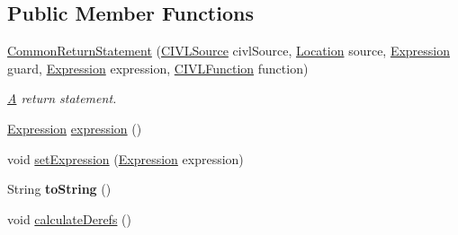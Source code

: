 \subsection*{Public Member Functions}
\begin{DoxyCompactItemize}
\item 
\hyperlink{classedu_1_1udel_1_1cis_1_1vsl_1_1civl_1_1model_1_1common_1_1statement_1_1CommonReturnStatement_a0a579c5c5d409ed8215f6fa87ad483bf}{Common\+Return\+Statement} (\hyperlink{interfaceedu_1_1udel_1_1cis_1_1vsl_1_1civl_1_1model_1_1IF_1_1CIVLSource}{C\+I\+V\+L\+Source} civl\+Source, \hyperlink{interfaceedu_1_1udel_1_1cis_1_1vsl_1_1civl_1_1model_1_1IF_1_1location_1_1Location}{Location} source, \hyperlink{interfaceedu_1_1udel_1_1cis_1_1vsl_1_1civl_1_1model_1_1IF_1_1expression_1_1Expression}{Expression} guard, \hyperlink{interfaceedu_1_1udel_1_1cis_1_1vsl_1_1civl_1_1model_1_1IF_1_1expression_1_1Expression}{Expression} expression, \hyperlink{interfaceedu_1_1udel_1_1cis_1_1vsl_1_1civl_1_1model_1_1IF_1_1CIVLFunction}{C\+I\+V\+L\+Function} function)
\begin{DoxyCompactList}\small\item\em \hyperlink{structA}{A} return statement. \end{DoxyCompactList}\item 
\hyperlink{interfaceedu_1_1udel_1_1cis_1_1vsl_1_1civl_1_1model_1_1IF_1_1expression_1_1Expression}{Expression} \hyperlink{classedu_1_1udel_1_1cis_1_1vsl_1_1civl_1_1model_1_1common_1_1statement_1_1CommonReturnStatement_a88f91430bf8e0efa9156b6c2a3d8531d}{expression} ()
\item 
void \hyperlink{classedu_1_1udel_1_1cis_1_1vsl_1_1civl_1_1model_1_1common_1_1statement_1_1CommonReturnStatement_a1f46116b79a27a37dd0aba49859b35bf}{set\+Expression} (\hyperlink{interfaceedu_1_1udel_1_1cis_1_1vsl_1_1civl_1_1model_1_1IF_1_1expression_1_1Expression}{Expression} expression)
\item 
\hypertarget{classedu_1_1udel_1_1cis_1_1vsl_1_1civl_1_1model_1_1common_1_1statement_1_1CommonReturnStatement_a76960d8db29378b565ee19d273890b56}{}String {\bfseries to\+String} ()\label{classedu_1_1udel_1_1cis_1_1vsl_1_1civl_1_1model_1_1common_1_1statement_1_1CommonReturnStatement_a76960d8db29378b565ee19d273890b56}

\item 
\hypertarget{classedu_1_1udel_1_1cis_1_1vsl_1_1civl_1_1model_1_1common_1_1statement_1_1CommonReturnStatement_abfeb7eb34d8505b4eec3cf7514d93721}{}void \hyperlink{classedu_1_1udel_1_1cis_1_1vsl_1_1civl_1_1model_1_1common_1_1statement_1_1CommonReturnStatement_abfeb7eb34d8505b4eec3cf7514d93721}{calculate\+Derefs} ()\label{classedu_1_1udel_1_1cis_1_1vsl_1_1civl_1_1model_1_1common_1_1statement_1_1CommonReturnStatement_abfeb7eb34d8505b4eec3cf7514d93721}


\end{DoxyCompactItemize}
